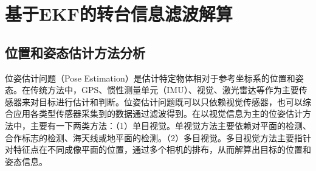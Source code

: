 \section{基于EKF的转台信息滤波解算}
\subsection{位置和姿态估计方法分析}
位姿估计问题（Pose Estimation）是估计特定物体相对于参考坐标系的位置和姿态。在传统方法中，GPS、惯性测量单元（IMU）、视觉、激光雷达等作为主要传感器来对目标进行估计和判断。位姿估计问题既可以只依赖视觉传感器，也可以综合应用各类型传感器采集到的数据通过滤波得到。在以视觉信息为主的位姿估计方法中，主要有一下两类方法：（1）单目视觉。单视觉方法主要依赖对平面的检测、合作标志的检测、海天线或地平面的检测。（2）多目视觉。多目视觉方法主要指针对特征点在不同成像平面的位置，通过多个相机的排布，从而解算出目标的位置和姿态信息。


